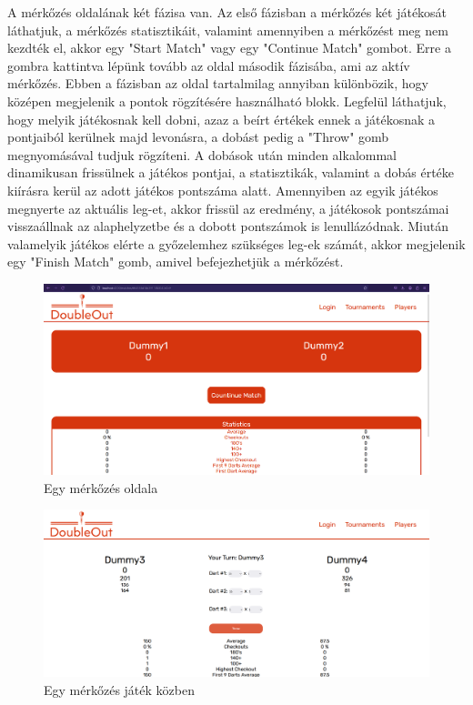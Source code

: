 A mérkőzés oldalának két fázisa van. Az első fázisban a mérkőzés két játékosát láthatjuk, a mérkőzés statisztikáit, valamint amennyiben a mérkőzést meg nem kezdték el, akkor egy "Start Match" vagy egy "Continue Match" gombot. Erre a gombra kattintva lépünk tovább az oldal második fázisába, ami az aktív mérkőzés. Ebben a fázisban az oldal tartalmilag annyiban különbözik, hogy középen megjelenik a pontok rögzítésére használható blokk. Legfelül láthatjuk, hogy melyik játékosnak kell dobni, azaz a beírt értékek ennek a játékosnak a pontjaiból kerülnek majd levonásra, a dobást pedig a "Throw" gomb megnyomásával tudjuk rögzíteni. A dobások után minden alkalommal dinamikusan frissülnek a játékos pontjai, a statisztikák, valamint a dobás értéke kiírásra kerül az adott játékos pontszáma alatt. Amennyiben az egyik játékos megnyerte az aktuális leg-et, akkor frissül az eredmény, a játékosok pontszámai visszaállnak az alaphelyzetbe és a dobott pontszámok is lenullázódnak. Miután valamelyik játékos elérte a győzelemhez szükséges leg-ek számát, akkor megjelenik egy "Finish Match" gomb, amivel befejezhetjük a mérkőzést.

\begin{figure}[h]
\centering
\includegraphics[scale=0.3]{images/MatchTest1.png}
\caption{Egy mérkőzés oldala}
\label{fig:matchTest1}
\end{figure}

\begin{figure}[h]
\centering
\includegraphics[scale=0.3]{images/MatchTest2.png}
\caption{Egy mérkőzés játék közben}
\label{fig:matchTest2}
\end{figure}

